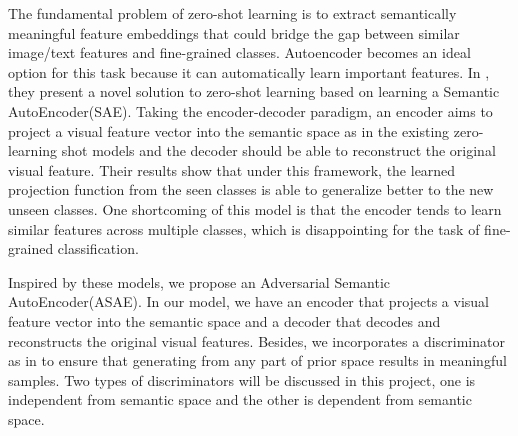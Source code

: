 \documentclass{article}
\begin{document}
The fundamental problem of zero-shot learning is to extract semantically meaningful feature embeddings that could bridge the gap between similar image/text features and fine-grained classes. Autoencoder becomes an ideal option for this task because it can automatically learn important features. In \cite{kodirov2017semantic}, they present a novel solution to zero-shot learning based on learning a Semantic AutoEncoder(SAE). Taking the encoder-decoder paradigm, an encoder aims to project a visual feature vector into the semantic space as in the existing zero-learning shot models and the decoder should be able to reconstruct the original visual feature. Their results show that under this framework, the learned projection function from the seen classes is able to generalize better to the new unseen classes. One shortcoming of this model is that the encoder tends to learn similar features across multiple classes, which is disappointing for the task of fine-grained classification. 

Inspired by these models, we propose an Adversarial Semantic AutoEncoder(ASAE). In our model, we have an encoder that projects a visual feature vector into the semantic space and a decoder that decodes and reconstructs the original visual features. Besides, we incorporates a discriminator as in \cite{makhzani2015adversarial} to ensure that generating from any part of prior space results in meaningful samples. Two types of discriminators will be discussed in this project, one is independent from semantic space and the other is dependent from semantic space. 

\end{document}
